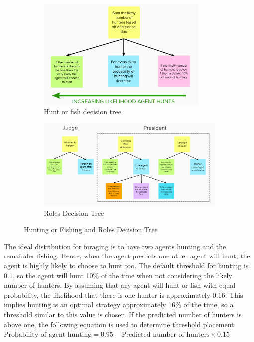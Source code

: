 \begin{figure}[!htb]
    \centering
    \begin{subfigure}{.49\textwidth}
        \centering
        \includegraphics[width=0.9\textwidth]{images/forage_decision.png}
        \caption{Hunt or fish decision tree }
        \label{fig: Hunt or fish decision tree }
    \end{subfigure}
    \begin{subfigure}{.49\textwidth}
        \centering
        \includegraphics[width=1.0\textwidth]{images/Roles Decision Tree.png}
        \caption{Roles Decision Tree}
        \label{fig: Roles Decision Tree}        
    \end{subfigure}
    \caption{Hunting or Fishing and Roles Decision Tree}
\end{figure}

The ideal distribution for foraging is to have two agents hunting and the remainder fishing. Hence, when the agent predicts one other agent will hunt, the agent is highly likely to choose to hunt too. The default threshold for hunting is 0.1, so the agent will hunt 10\% of the time when not considering the likely number of hunters. By assuming that any agent will hunt or fish with equal probability, the likelihood that there is one hunter is approximately 0.16. This implies hunting is an optimal strategy approximately 16\% of the time, so a threshold similar to this value is chosen. If the predicted number of hunters is above one, the following equation is used to determine threshold placement: $\text{Probability of agent hunting} = 0.95 - \text{Predicted number of hunters} \times 0.15$

